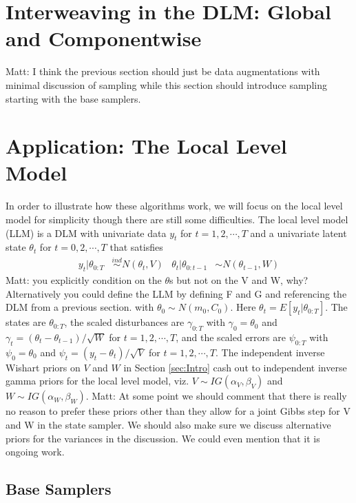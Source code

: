 \documentclass{article}
\newcommand{\matt}[1]{{\color{red} Matt: #1}}
\begin{document}
\section{Interweaving in the DLM: Global and Componentwise}\label{sec:DLMinter}
\matt{I think the previous section should just be data augmentations with minimal discussion of sampling while this section should introduce sampling starting with the base samplers.}


\section{Application: The Local Level Model}\label{sec:LLMest}

In order to illustrate how these algorithms work, we will focus on the local level model for simplicity though there are still some difficulties. The local level model (LLM) is a DLM with univariate data $y_t$ for $t=1,2,\cdots,T$ and a univariate latent state $\theta_t$ for $t=0,2,\cdots,T$ that satisfies
\begin{align}
  y_t |\theta_{0:T}& \stackrel{ind}{\sim} N(\theta_t,V) & 
  \theta_t |\theta_{0:t-1}& \sim N(\theta_{t-1},W) 
\end{align}
\matt{you explicitly condition on the $\theta$s but not on the V and W, why? Alternatively you could define the LLM by defining F and G and referencing the DLM from a previous section.} 
with $\theta_0\sim N(m_0,C_0)$. Here $\theta_t=E[y_t|\theta_{0:T}]$. The states are $\theta_{0:T}$, the scaled disturbances are $\gamma_{0:T}$ with $\gamma_0=\theta_0$ and $\gamma_t=(\theta_t - \theta_{t-1})/\sqrt{W}$ for $t=1,2,\cdots,T$, and the scaled errors are $\psi_{0:T}$ with $\psi_0=\theta_0$ and $\psi_t=(y_t - \theta_t)/\sqrt{V}$ for $t=1,2,\cdots,T$. The independent inverse Wishart priors on $V$ and $W$ in Section \ref{sec:Intro} cash out to independent inverse gamma priors for the local level model, viz. $V\sim IG(\alpha_V,\beta_V)$ and $W\sim IG(\alpha_W,\beta_W)$. \matt{At some point we should comment that there is really no reason to prefer these priors other than they allow for a joint Gibbs step for V and W in the state sampler. We should also make sure we discuss alternative priors for the variances in the discussion. We could even mention that it is ongoing work.}

\subsection{Base Samplers}\label{sec:LLMbase}
\end{document}
